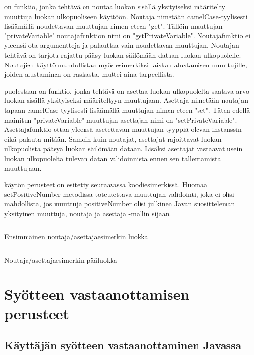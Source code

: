 \documentclass{tufte-book}
\newcommand{\code}[3]{
\begin{listing}
    \inputminted{java}{OhjelmointiopasEsimerkit/src/#1/#2.java}
    \caption{#3}
    \label{Java-#1-#2}
\end{listing}
}
\begin{document}
 on funktio, jonka tehtävä on noutaa luokan sisällä yksityiseksi
määritelty muuttuja luokan ulkopuoliseen käyttöön. Noutaja nimetään camelCase-tyylisesti
lisäämällä noudettavan muuttujan nimen eteen "get". Tällöin muuttujan "privateVariable"
noutajafunktion nimi on "getPrivateVariable". Noutajafunktio ei yleensä ota argumentteja ja
palauttaa vain noudettavan muuttujan. Noutajan tehtävä on tarjota rajattu pääsy luokan
säilömään dataan luokan ulkopuolelle. Noutajien käyttö mahdollistaa myös esimerkiksi laiskan
alustamisen muuttujille, joiden alustaminen on raskasta, muttei aina tarpeellista.

 puolestaan on funktio, jonka tehtävä on asettaa luokan
ulkopuolelta saatava arvo luokan sisällä yksityiseksi määriteltyyn muuttujaan. Asettaja nimetään
noutajan tapaan camelCase-tyylisesti lisäämällä muuttujan nimen eteen "set". Täten edellä mainitun
"privateVariable"-muuttujan asettajan nimi on "setPrivateVariable". Asettajafunktio ottaa yleensä
asetettavan muuttujan tyyppiä olevan instanssin eikä palauta mitään. Samoin kuin noutajat,
asettajat rajoittavat luokan ulkopuolista pääsyä luokan säilömään dataan. Lisäksi asettajat
vastaavat usein luokan ulkopuolelta tulevan datan validoinnista ennen sen tallentamista
muuttujaan.

 käytön perusteet on esitetty seuraavassa koodiesimerkissä.
Huomaa setPositiveNumber-metodissa toteutettava muuttujan validointi, joka ei olisi mahdollista,
jos muuttuja positiveNumber olisi julkinen Javan suositteleman yksityinen muuttuja, noutaja ja
asettaja -mallin sijaan.

\code{week2}{GetterSetterChild}{Ensimmäinen noutaja/asettajaesimerkin luokka}
\code{week2}{GetterSetterMain}{Noutaja/asettajaesimerkin pääluokka}


\section{Syötteen vastaanottamisen perusteet}
\label{syötteestä}

\subsection{Käyttäjän syötteen vastaanottaminen Javassa}
\label{input}
\end{document}
